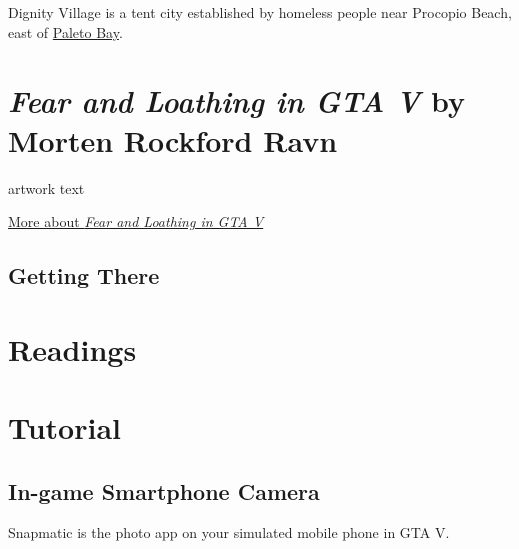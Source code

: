 \documentclass[
  openany]{book}
\begin{document}
Dignity Village is a tent city established by homeless people near Procopio Beach, east of \href{https://grandtheftdata.com/landmarks/\#-171.667,6208.676,5,hybrid,name=paleto_bay,Belinda_May's_Beauty_Salon,_Paleto_Blvd,_Paleto_Bay}{Paleto Bay}.

\hypertarget{fear-and-loathing-in-gta-v-by-morten-rockford-ravn}{%
\section*{\texorpdfstring{\emph{Fear and Loathing in GTA V} by Morten Rockford Ravn}{Fear and Loathing in GTA V by Morten Rockford Ravn}}\label{fear-and-loathing-in-gta-v-by-morten-rockford-ravn}}

artwork text

\href{https://fearandloathingingtav.tumblr.com/}{More about \emph{Fear and Loathing in GTA V}}

\hypertarget{getting-there-2}{%
\subsection*{Getting There}\label{getting-there-2}}

\hypertarget{readings-1}{%
\section*{Readings}\label{readings-1}}

\hypertarget{tutorial-1}{%
\section*{Tutorial}\label{tutorial-1}}

\hypertarget{in-game-smartphone-camera}{%
\subsection*{In-game Smartphone Camera}\label{in-game-smartphone-camera}}

Snapmatic is the photo app on your simulated mobile phone in GTA V.
\end{document}
